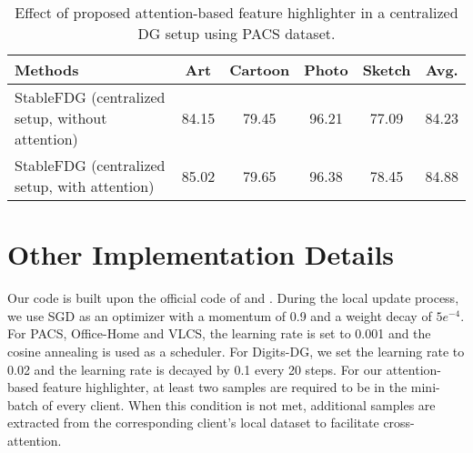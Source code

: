 \documentclass{article}
\theoremstyle{plain}
\theoremstyle{definition}
\theoremstyle{remark}
\begin{document}
\begin{table}[h]
\small
\centering
	\begin{tabular}{l|    cccc | c}
		\toprule  
		Methods   &Art  & Cartoon & Photo & Sketch & Avg. \\ 
		\midrule	
		StableFDG (centralized setup, without attention)	 &84.15 & 79.45 & 96.21 & 77.09& 84.23\\
		StableFDG (centralized setup, with attention)	& 85.02 & 79.65 & 96.38 & 78.45& 84.88  \\
		
		\bottomrule
	\end{tabular}
\vspace{+3mm}
\caption{Effect of proposed attention-based feature highlighter in a centralized DG setup using PACS dataset. } 
\label{table:cenattn}
\end{table} 






\section{Other Implementation Details}
Our code is built upon the official code of \cite{zhou2021domain} and \cite{bello2019attention}. During the local update process, we use SGD as an optimizer  with a momentum of  0.9 and a weight decay of $5e^{-4}$. For PACS, Office-Home and VLCS, the learning rate is set to 0.001 and the cosine annealing is used as a scheduler. For Digits-DG, we set the learning rate to 0.02 and the learning rate is decayed by 0.1 every 20 steps.  For our attention-based feature highlighter, at least two samples are required to be in the mini-batch of every client. When this condition is not met, additional samples are extracted from the corresponding client's local dataset to facilitate cross-attention.
\end{document}
